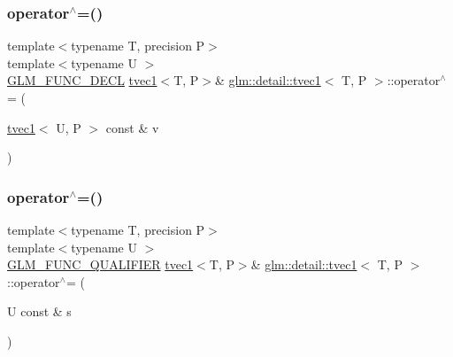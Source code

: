 \mbox{\label{structglm_1_1detail_1_1tvec1_a03d26aae5b039d37df678fe8648efbb8}} 
\subsubsection{\texorpdfstring{operator$^\wedge$=()}{operator^=()}\hspace{0.1cm}{\footnotesize\ttfamily [2/4]}}
{\footnotesize\ttfamily template$<$typename T, precision P$>$ \\
template$<$typename U $>$ \\
\hyperlink{setup_8hpp_ab2d052de21a70539923e9bcbf6e83a51}{G\+L\+M\+\_\+\+F\+U\+N\+C\+\_\+\+D\+E\+CL} \hyperlink{structglm_1_1detail_1_1tvec1}{tvec1}$<$T, P$>$\& \hyperlink{structglm_1_1detail_1_1tvec1}{glm\+::detail\+::tvec1}$<$ T, P $>$\+::operator$^\wedge$= (\begin{DoxyParamCaption}\item[{\hyperlink{structglm_1_1detail_1_1tvec1}{tvec1}$<$ U, P $>$ const \&}]{v }\end{DoxyParamCaption})}

\mbox{\label{structglm_1_1detail_1_1tvec1_a72ace2280c4b3e1487a469b652c120cd}} 
\subsubsection{\texorpdfstring{operator$^\wedge$=()}{operator^=()}\hspace{0.1cm}{\footnotesize\ttfamily [3/4]}}
{\footnotesize\ttfamily template$<$typename T, precision P$>$ \\
template$<$typename U $>$ \\
\hyperlink{setup_8hpp_a33fdea6f91c5f834105f7415e2a64407}{G\+L\+M\+\_\+\+F\+U\+N\+C\+\_\+\+Q\+U\+A\+L\+I\+F\+I\+ER} \hyperlink{structglm_1_1detail_1_1tvec1}{tvec1}$<$T, P$>$\& \hyperlink{structglm_1_1detail_1_1tvec1}{glm\+::detail\+::tvec1}$<$ T, P $>$\+::operator$^\wedge$= (\begin{DoxyParamCaption}\item[{U const \&}]{s }\end{DoxyParamCaption})}



